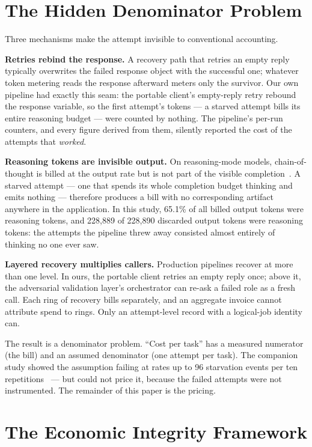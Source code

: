 \documentclass[11pt]{article}
\begin{document}
\section{The Hidden Denominator Problem}\label{sec:hidden}

Three mechanisms make the attempt invisible to conventional accounting.

\textbf{Retries rebind the response.} A recovery path that retries an
empty reply typically overwrites the failed response object with the
successful one; whatever token metering reads the response afterward
meters only the survivor. Our own pipeline had exactly this seam: the
portable client's empty-reply retry rebound the response variable, so
the first attempt's tokens --- a starved attempt bills its entire
reasoning budget --- were counted by nothing. The pipeline's per-run
counters, and every figure derived from them, silently reported the
cost of the attempts that \emph{worked}.

\textbf{Reasoning tokens are invisible output.} On reasoning-mode
models, chain-of-thought is billed at the output rate but is not part
of the visible completion~\cite{openaireasoning,deepseekdocs}. A
starved attempt --- one that spends its whole completion budget
thinking and emits nothing --- therefore produces a bill with no
corresponding artifact anywhere in the application. In this study,
65.1\% of all billed output tokens were reasoning tokens, and 228{,}889
of 228{,}890 discarded output tokens were reasoning tokens: the attempts
the pipeline threw away consisted almost entirely of thinking no one
ever saw.

\textbf{Layered recovery multiplies callers.} Production pipelines
recover at more than one level. In ours, the portable client retries an
empty reply once; above it, the adversarial validation layer's
orchestrator can re-ask a failed role as a fresh call. Each ring of
recovery bills separately, and an aggregate invoice cannot attribute
spend to rings. Only an attempt-level record with a logical-job
identity can.

The result is a denominator problem. ``Cost per task'' has a measured
numerator (the bill) and an assumed denominator (one attempt per task).
The companion study showed the assumption failing at rates up to 96
starvation events per ten repetitions~\cite{reliability} --- but could
not price it, because the failed attempts were not instrumented. The
remainder of this paper is the pricing.

\section{The Economic Integrity Framework}\label{sec:framework}
\end{document}
